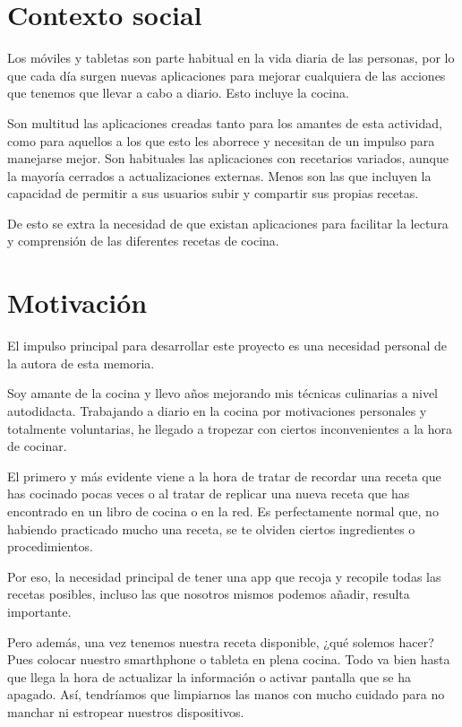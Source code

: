 \section{Contexto social}

Los móviles y tabletas son parte habitual en la vida diaria de las personas, por
lo que cada día surgen nuevas aplicaciones para mejorar cualquiera de las
acciones que tenemos que llevar a cabo a diario. Esto incluye la cocina.

Son multitud las aplicaciones creadas tanto para los amantes de esta actividad,
como para aquellos a los que esto les aborrece y necesitan de un impulso para
manejarse mejor. Son habituales las aplicaciones con recetarios variados, aunque
la mayoría cerrados a actualizaciones externas. Menos son las que incluyen la
capacidad de permitir a sus usuarios subir y compartir sus propias recetas.

De esto se extra la necesidad de que existan aplicaciones para facilitar la
lectura y comprensión de las diferentes recetas de cocina.


\section{Motivación}
\label{sec:situacion-actual}

El impulso principal para desarrollar este proyecto es una necesidad personal
de la autora de esta memoria.

Soy amante de la cocina y llevo años mejorando mis técnicas culinarias a nivel
autodidacta. Trabajando a diario en la cocina por motivaciones personales y
totalmente voluntarias, he llegado a tropezar con ciertos inconvenientes a la
hora de cocinar.

El primero y más evidente viene a la hora de tratar de recordar una receta que
has cocinado pocas veces o al tratar de replicar una nueva receta que has
encontrado en un libro de cocina o en la red. Es perfectamente normal que, no
habiendo practicado mucho una receta, se te olviden ciertos ingredientes o
procedimientos. 

Por eso, la necesidad principal de tener una app que recoja y recopile todas
las recetas posibles, incluso las que nosotros mismos podemos añadir, resulta
importante.

Pero además, una vez tenemos nuestra receta disponible, ¿qué solemos hacer?
Pues colocar nuestro smarthphone o tableta en plena cocina. Todo va bien hasta
que llega la hora de actualizar la información o activar pantalla que se ha
apagado. Así, tendríamos que limpiarnos las manos con mucho cuidado para no
manchar ni estropear nuestros dispositivos.

